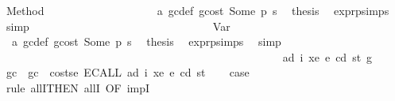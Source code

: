 \begin{isabellebody}
\ {\isacharparenleft}{\kern0pt}Method\ {\isacharunderscore}{\kern0pt}{\isacharparenright}{\kern0pt}\isanewline
\ \ \ \ \ \ \ \ \ \ \ \ \ \ \ \ \isamarkupfalse%
\ {}{}{\isacharparenleft}{\kern0pt}{}{\isacharparenright}{\kern0pt}\ a{}\ gc{\isacharunderscore}{\kern0pt}def\ gcost\ Some\ p{}\ s{}\ \isamarkupfalse%
\ {\isacharquery}{\kern0pt}thesis\ \isamarkupfalse%
\ expr{\isachardot}{\kern0pt}psimps{\isacharparenleft}{\kern0pt}{}{}{\isacharparenright}{\kern0pt}\ \isamarkupfalse%
\ simp\isanewline
\ \ \ \ \ \ \ \ \ \ \ \ \ \ \isamarkupfalse%
\isanewline
\ \ \ \ \ \ \ \ \ \ \ \ \ \ \ \ \isamarkupfalse%
\ {\isacharparenleft}{\kern0pt}Var\ {\isacharunderscore}{\kern0pt}{\isacharparenright}{\kern0pt}\isanewline
\ \ \ \ \ \ \ \ \ \ \ \ \ \ \ \ \isamarkupfalse%
\ {}{}{\isacharparenleft}{\kern0pt}{}{\isacharparenright}{\kern0pt}\ a{}\ gc{\isacharunderscore}{\kern0pt}def\ gcost\ Some\ p{}\ s{}\ \isamarkupfalse%
\ {\isacharquery}{\kern0pt}thesis\ \isamarkupfalse%
\ expr{\isachardot}{\kern0pt}psimps{\isacharparenleft}{\kern0pt}{}{}{\isacharparenright}{\kern0pt}\ \isamarkupfalse%
\ simp\isanewline
\ \ \ \ \ \ \ \ \ \ \ \ \ \ \isamarkupfalse%
\isanewline
\ \ \ \ \ \ \ \ \ \ \ \ \isamarkupfalse%
\isanewline
\ \ \ \ \ \ \ \ \ \ \isamarkupfalse%
\isanewline
\ \ \ \ \ \ \ \ \isamarkupfalse%
\isanewline
\ \ \ \ \ \ \isamarkupfalse%
\isanewline
\ \ \ \ \isamarkupfalse%
\isanewline
\ \ \isamarkupfalse%
\isanewline
{}\isamarkupfalse%
\isanewline
\ \ \isamarkupfalse%
\ {\isacharparenleft}{\kern0pt}{}{}\ ad\ i\ xe\ e\ cd\ st\ g{\isacharparenright}{\kern0pt}\isanewline
\ \ \isamarkupfalse%
\ gc\ \ {\isachardoublequoteopen}gc\ {\isacharequal}{\kern0pt}\ costs\isactrlsub e\ {\isacharparenleft}{\kern0pt}ECALL\ ad\ i\ xe{\isacharparenright}{\kern0pt}\ e\ cd\ st{\isachardoublequoteclose}\isanewline
\ \ \isamarkupfalse%
\ {\isacharquery}{\kern0pt}case\isanewline
\ \ \isamarkupfalse%
\ {\isacharparenleft}{\kern0pt}rule\ allI{\isacharbrackleft}{\kern0pt}THEN\ allI{\isacharcomma}{\kern0pt}\ OF\ impI{\isacharbrackright}{\kern0pt}{\isacharparenright}{\kern0pt}\isanewline

\end{isabellebody}
